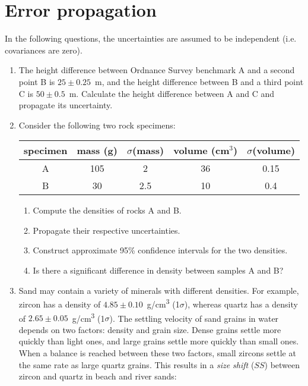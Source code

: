 \section{Error propagation}
\label{sec:ex-errorprop}

In the following questions, the uncertainties are assumed to be
independent (i.e. covariances are zero).

\begin{enumerate}
  
\item The height difference between Ordnance Survey benchmark A and a
  second point B is $25\pm0.25$~m, and the height difference between B
  and a third point C is $50\pm0.5$~m. Calculate the height difference
  between A and C and propagate its uncertainty.
  
\item Consider the following two rock specimens:

\begin{tabular}{ccccc}
specimen & mass (g) & $\sigma$(mass) & volume (cm$^3$) & $\sigma$(volume) \\
\hline 
A & 105 & 2 & 36 & 0.15\\
B & 30 & 2.5 & 10 & 0.4
\end{tabular}

\begin{enumerate}
\item Compute the densities of rocks A and B.
\item Propagate their respective uncertainties.
\item Construct approximate 95\% confidence intervals for the two densities.
\item Is there a significant difference in density between samples A and B?
\end{enumerate}

\item Sand may contain a variety of minerals with different densities.
  For example, zircon has a density of
  $4.85\pm0.10$~g/cm\textsuperscript{3} (1$\sigma$), whereas quartz
  has a density of $2.65\pm0.05$~g/cm\textsuperscript{3} (1$\sigma$).
  The settling velocity of sand grains in water depends on two
  factors: density and grain size. Dense grains settle more quickly
  than light ones, and large grains settle more quickly than small
  ones. When a balance is reached between these two factors, small
  zircons settle at the same rate as large quartz grains. This results
  in a \emph{size shift} ($SS$) between zircon and quartz in beach and
  river sands:


\end{enumerate}
